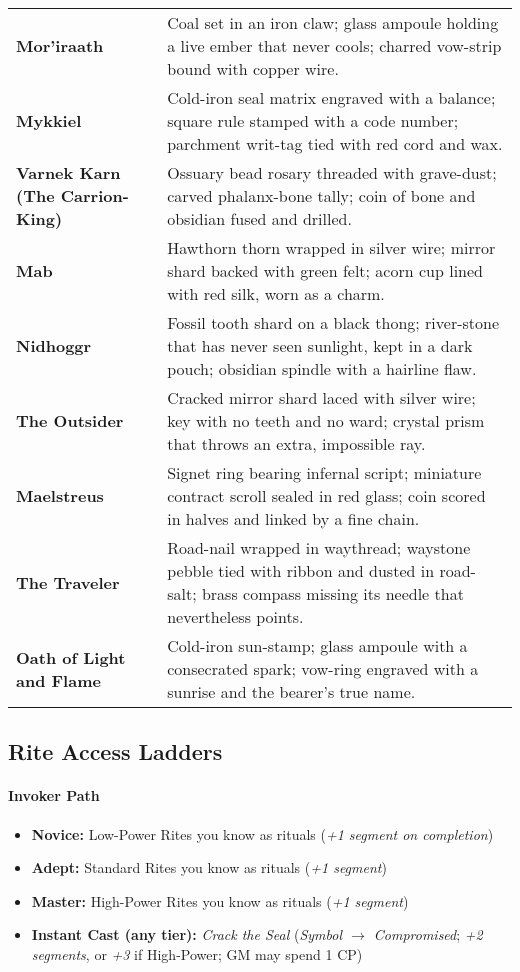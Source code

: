 \documentclass[12pt,twoside]{book}
\begin{document}
\begin{table}[htbp]
\begin{tabular}{>{\bfseries}p{4.0cm} >{\raggedright\arraybackslash}p{10.8cm}}
Mor'iraath & Coal set in an iron claw; glass ampoule holding a live ember that never cools; charred vow-strip bound with copper wire. \\
Mykkiel & Cold-iron seal matrix engraved with a balance; square rule stamped with a code number; parchment writ-tag tied with red cord and wax. \\
Varnek Karn (The Carrion-King) & Ossuary bead rosary threaded with grave-dust; carved phalanx-bone tally; coin of bone and obsidian fused and drilled. \\
Mab & Hawthorn thorn wrapped in silver wire; mirror shard backed with green felt; acorn cup lined with red silk, worn as a charm. \\
Nidhoggr & Fossil tooth shard on a black thong; river-stone that has never seen sunlight, kept in a dark pouch; obsidian spindle with a hairline flaw. \\
The Outsider & Cracked mirror shard laced with silver wire; key with no teeth and no ward; crystal prism that throws an extra, impossible ray. \\
Maelstreus & Signet ring bearing infernal script; miniature contract scroll sealed in red glass; coin scored in halves and linked by a fine chain. \\
The Traveler & Road-nail wrapped in waythread; waystone pebble tied with ribbon and dusted in road-salt; brass compass missing its needle that nevertheless points. \\
Oath of Light and Flame & Cold-iron sun-stamp; glass ampoule with a consecrated spark; vow-ring engraved with a sunrise and the bearer’s true name. \\
\bottomrule
\end{tabular}
\end{table}

\subsection*{Rite Access Ladders}

\paragraph{Invoker Path}
\begin{itemize}
  \item \textbf{Novice:} Low-Power Rites you know as rituals (\emph{+1 segment on completion})
  \item \textbf{Adept:} Standard Rites you know as rituals (\emph{+1 segment})
  \item \textbf{Master:} High-Power Rites you know as rituals (\emph{+1 segment})
  \item \textbf{Instant Cast (any tier):} \emph{Crack the Seal} (\emph{Symbol $\rightarrow$ Compromised}; \emph{+2 segments}, or \emph{+3} if High-Power; GM may spend 1 CP)
\end{itemize}
\end{document}
